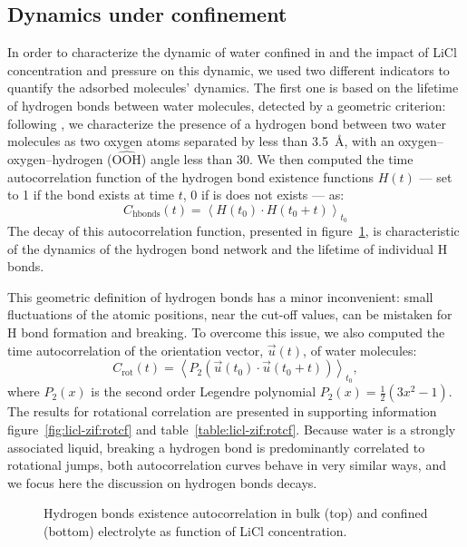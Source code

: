 \documentclass[thesis]{subfiles}
\begin{document}
\subsection{Dynamics under confinement}

In order to characterize the dynamic of water confined in  and the impact
of LiCl concentration and pressure on this dynamic, we used two different
indicators to quantify the adsorbed molecules' dynamics. The first one is based
on the lifetime of hydrogen bonds between water molecules, detected by a
geometric criterion: following \citeauthor{Luzar1996}\cite{Luzar1996}, we
characterize the presence of a hydrogen bond between two water molecules as two
oxygen atoms separated by less than \SI{3.5}{\angstrom}, with an
oxygen--oxygen--hydrogen ($\widehat{\text{OOH}}$) angle less than 30\textdegree.
We then computed the time autocorrelation function of the hydrogen bond
existence functions $H(t)$ --- set to 1 if the bond exists at time $t$, 0 if is
does not exists --- as:
\[C_{\text{hbonds}}(t) = \left\langle H(t_0) \cdot H(t_0 + t) \right\rangle_{t_0} \]
The decay of this autocorrelation function, presented in
figure~\ref{fig:licl-zif:hbonds}, is characteristic of the dynamics of the hydrogen bond
network and the lifetime of individual H bonds.

This geometric definition of hydrogen bonds has a minor inconvenient: small
fluctuations of the atomic positions, near the cut-off values, can be mistaken
for H bond formation and breaking. To overcome this issue, we also computed the
time autocorrelation of the orientation vector, $\vec u(t)$, of water molecules:
\[C_{\text{rot}}(t) = \left\langle P_2(\vec u(t_0) \cdot \vec u(t_0 + t)) \right\rangle_{t_0} ,\]
where $P_2(x)$ is the second order Legendre polynomial $P_2(x) = \frac{1}{2}
(3x^2 - 1)$\cite{Fogarty2014}. The results for rotational correlation are
presented in supporting information figure~\ref{fig:licl-zif:rotcf} and
table~\ref{table:licl-zif:rotcf}. Because water is a strongly associated liquid,
breaking a hydrogen bond is predominantly correlated to rotational jumps, both
autocorrelation curves behave in very similar ways, and we focus here the discussion
on hydrogen bonds decays.

\begin{figure}[ht]
    \centering
    
    \caption{Hydrogen bonds existence autocorrelation in bulk (top) and
    confined (bottom) electrolyte as function of LiCl concentration.}
    \label{fig:licl-zif:hbonds}
\end{figure}
\end{document}
